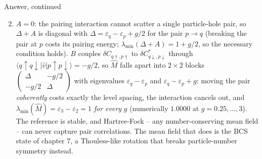 \documentclass[aspectratio=169,10pt]{beamer}
\newcounter{thinkctr}
\newcommand{\thinka}[1]{%
  \begin{tcolorbox}[colback=paleteal,colframe=teal,title={\bfseries Answer to pause \#\thethinkctr}]
  #1
  \end{tcolorbox}}
\newcommand{\element}[3]{\langle #1\vert #2\vert #3\rangle}
\begin{document}
\begin{frame}{Answer, continued}
  \thinka{
  \begin{enumerate}\setcounter{enumi}{1}
    \item $A=0$: the pairing interaction cannot scatter a single particle-hole pair, so $\Delta+A$ is diagonal with $\Delta=\varepsilon_q-\varepsilon_p+g/2$ for the pair $p\to q$ (breaking the pair at $p$ costs its pairing energy; $\lambda_{\min}(\Delta+A)=1+g/2$, so the necessary condition holds). $B$ couples $\delta C_{q\uparrow,p\uparrow}$ to $\delta C^{*}_{q\downarrow,p\downarrow}$ through $\element{q\!\uparrow q\!\downarrow}{\hat{v}}{p\!\uparrow p\!\downarrow}=-g/2$, so $\hat{M}$ falls apart into $2\times2$ blocks $\begin{pmatrix}\Delta & -g/2\\ -g/2 & \Delta\end{pmatrix}$ with eigenvalues $\varepsilon_q-\varepsilon_p$ and $\varepsilon_q-\varepsilon_p+g$: moving the pair \emph{coherently} costs exactly the level spacing, the interaction cancels out, and $\lambda_{\min}(\hat{M})=\varepsilon_3-\varepsilon_2=1$ \emph{for every} $g$ (numerically $1.0000$ at $g=0.25,\dots,3$). The reference is stable, and Hartree-Fock -- any number-conserving mean field -- can never capture pair correlations. The mean field that does is the BCS state of chapter 7, a Thouless-like rotation that breaks particle-number symmetry instead.
  \end{enumerate}}
\end{frame}
\end{document}
